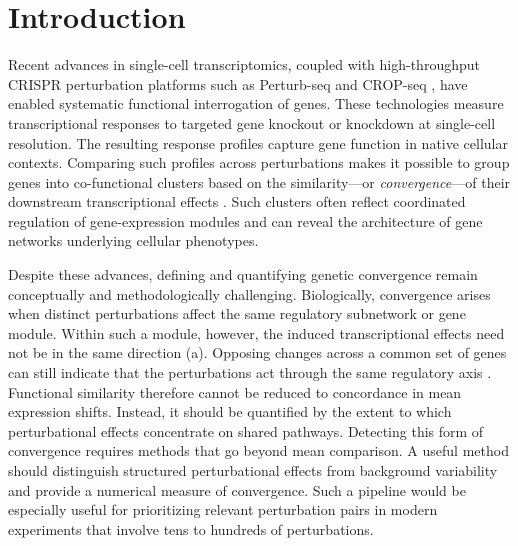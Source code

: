 \documentclass[11pt]{article}
\begin{document}
\section*{Introduction}
Recent advances in single-cell transcriptomics, coupled with high-throughput CRISPR perturbation platforms such as Perturb-seq \citep{Adamson:2016,Dixit:2016} and CROP-seq \citep{Jaitin:2016,Datlinger:2017}, have enabled systematic functional interrogation of genes. These technologies measure transcriptional responses to targeted gene knockout or knockdown at single-cell resolution. The resulting response profiles capture gene function in native cellular contexts. Comparing such profiles across perturbations makes it possible to group genes into co-functional clusters based on the similarity---or \textit{convergence}---of their downstream transcriptional effects \citep{Dixit:2016,Frangieh:2021,duan2019model,peidli2024scperturb,Regev:2023,schnitzler2024convergence,yang2025perturbdb}. Such clusters often reflect coordinated regulation of gene-expression modules and can reveal the architecture of gene networks underlying cellular phenotypes.

Despite these advances, defining and quantifying genetic convergence remain conceptually and methodologically challenging. Biologically, convergence arises when distinct perturbations affect the same regulatory subnetwork or gene module. Within such a module, however, the induced transcriptional effects need not be in the same direction (a). Opposing changes across a common set of genes can still indicate that the perturbations act through the same regulatory axis \citep{pensa2009stat1,dixit2016perturb,watanabe2019combinatorial}. Functional similarity therefore cannot be reduced to concordance in mean expression shifts. Instead, it should be quantified by the extent to which perturbational effects concentrate on shared pathways. Detecting this form of convergence requires methods that go beyond mean comparison. A useful method should distinguish structured perturbational effects from background variability and provide a numerical measure of convergence. Such a pipeline would be especially useful for prioritizing relevant perturbation pairs in modern experiments that involve tens to hundreds of perturbations.
\end{document}
